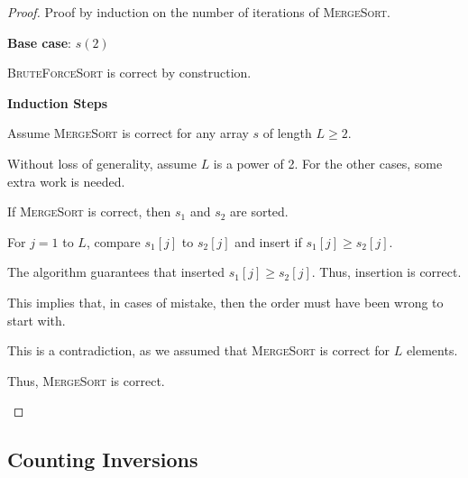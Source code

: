 \begin{proof}
    Proof by induction on the number of iterations of \textsc{MergeSort}.

    \begin{listu}
        \item \textbf{Base case}: $s(2)$
        
        \textsc{BruteForceSort} is correct by construction.

        \item \textbf{Induction Steps}
        
        Assume \textsc{MergeSort} is correct for any array $s$ of length $L \ge 2$. 

        Without loss of generality, assume $L$ is a power of 2. For the other cases, some extra work is needed.
        
        \begin{center}
        \end{center}

        If \textsc{MergeSort} is correct, then $s_1$ and $s_2$ are sorted.

        For $j = 1$ to $L$, compare $s_1[j]$ to $s_2[j]$ and insert if $s_1[j] \ge s_2[j]$.

        The algorithm guarantees that inserted $s_1[j] \ge s_2[j]$. Thus, insertion is correct.

        This implies that, in cases of mistake, then the order must have been wrong to start with. 

        This is a contradiction, as we assumed that \textsc{MergeSort} is correct for $L$ elements.

        Thus, \textsc{MergeSort} is correct. 
    \end{listu}
\end{proof}

\subsection{Counting Inversions}

